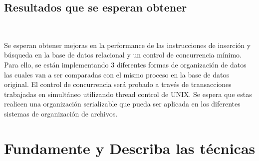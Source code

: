 \documentclass{article}
\begin{document}
    \subsection{Resultados que se esperan obtener} 

      Se esperan obtener mejoras en la performance de las instrucciones de inserción y búsqueda en la base de datos relacional y un control de concurrencia mínimo. Para ello, se están implementando 3 diferentes formas de organización de datos las cuales van a ser comparadas con el mismo proceso en la base de datos original. El control de concurrencia será probado a través de transacciones trabajadas en simultáneo utilizando thread control de UNIX. Se espera que estas realicen una organización serializable que pueda ser aplicada en los diferentes sistemas de organización de archivos.

  \section{Fundamente y Describa las técnicas} 
\end{document}
